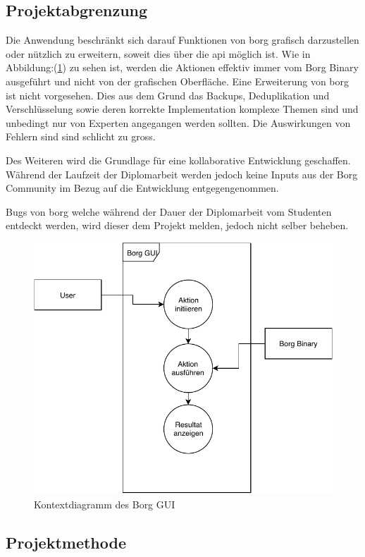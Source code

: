 \newpage
\subsection{Projektabgrenzung}
\label{sec:org82d5209}

Die Anwendung beschränkt sich darauf Funktionen von \gls{borg} grafisch
darzustellen oder nützlich zu erweitern, soweit dies über die \gls{api} möglich
ist. Wie in Abbildung:(\ref{fig:org5ba804d}) zu sehen ist, werden die Aktionen effektiv
immer vom Borg Binary ausgeführt und nicht von der grafischen Oberfläche. Eine
Erweiterung von \gls{borg} ist nicht vorgesehen. Dies aus dem Grund das Backups,
Deduplikation und Verschlüsselung sowie deren korrekte Implementation komplexe
Themen sind und unbedingt nur von Experten angegangen werden sollten. Die
Auswirkungen von Fehlern sind sind schlicht zu gross.

Des Weiteren wird die Grundlage für eine kollaborative Entwicklung geschaffen.
Während der Laufzeit der Diplomarbeit werden jedoch keine Inputs aus der Borg
Community im Bezug auf die Entwicklung entgegengenommen.

Bugs von \gls{borg} welche während der Dauer der Diplomarbeit vom Studenten
entdeckt werden, wird dieser dem Projekt melden, jedoch nicht selber beheben.

\begin{figure}[htbp]
\centering
\includegraphics[width=.9\linewidth]{pictures/kontextdiagramm.pdf}
\caption{\label{fig:org5ba804d}
Kontextdiagramm des Borg GUI}
\end{figure}

\subsection{Projektmethode}
\label{sec:org7ae08c5}

